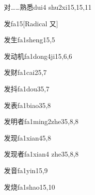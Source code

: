 \begin{verbete}{对……熟悉}{dui4 shu2xi1}{5,15,11}
\end{verbete}

\begin{verbete}{发}{fa1}{5}[Radical ⼜]
\end{verbete}

\begin{verbete}{发生}{fa1sheng1}{5,5}
\end{verbete}

\begin{verbete}{发动机}{fa1dong4ji1}{5,6,6}
\end{verbete}

\begin{verbete}{发财}{fa1cai2}{5,7}
\end{verbete}

\begin{verbete}{发抖}{fa1dou3}{5,7}
\end{verbete}

\begin{verbete}{发表}{fa1biao3}{5,8}
\end{verbete}

\begin{verbete}{发明者}{fa1ming2zhe3}{5,8,8}
\end{verbete}

\begin{verbete}{发现}{fa1xian4}{5,8}
\end{verbete}

\begin{verbete}{发现者}{fa1xian4 zhe3}{5,8,8}
\end{verbete}

\begin{verbete}{发音}{fa1yin1}{5,9}
\end{verbete}

\begin{verbete}{发烧}{fa1shao1}{5,10}
\end{verbete}

